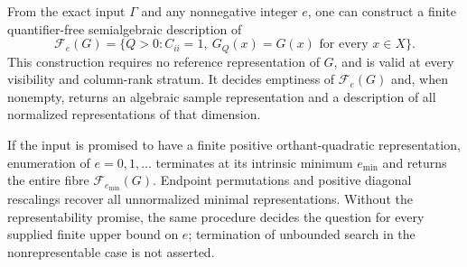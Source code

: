 \begin{theorem}\label{thm:intrinsic-fibre}
From the exact input $\Gamma$ and any nonnegative integer $e$, one can construct a finite quantifier-free semialgebraic description of
\[
 \mathcal F_e(G)=\{Q>0:C_{ii}=1,\ G_Q(x)=G(x)\text{ for every }x\in X\}.
\]
This construction requires no reference representation of $G$, and is valid at every visibility and column-rank stratum. It decides emptiness of $\mathcal F_e(G)$ and, when nonempty, returns an algebraic sample representation and a description of all normalized representations of that dimension.

If the input is promised to have a finite positive orthant-quadratic representation, enumeration of $e=0,1,\ldots$ terminates at its intrinsic minimum $e_{\min}$ and returns the entire fibre $\mathcal F_{e_{\min}}(G)$. Endpoint permutations and positive diagonal rescalings recover all unnormalized minimal representations. Without the representability promise, the same procedure decides the question for every supplied finite upper bound on $e$; termination of unbounded search in the nonrepresentable case is not asserted.
\end{theorem}
